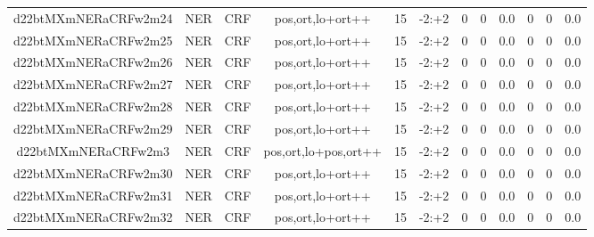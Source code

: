 \documentclass[a4paper]{article}
\begin{document}
\begin{landscape}
\begin{center}
\begin{tabular}{ |c|c|c|c|c|c|c|c|c|c|c|c|}
 
 	
 	\small{ d22btMXmNERaCRFw2m24 } & \small{ NER} & \small{  CRF }  & pos,ort,lo+ort++  &  15 &  \small{  -2:+2 }  &  0 & 0 & 0.0  &  0 & 0 & 0.0 \\
 	

 
 	
 	\small{ d22btMXmNERaCRFw2m25 } & \small{ NER} & \small{  CRF }  & pos,ort,lo+ort++  &  15 &  \small{  -2:+2 }  &  0 & 0 & 0.0  &  0 & 0 & 0.0 \\
 	

 
 	
 	\small{ d22btMXmNERaCRFw2m26 } & \small{ NER} & \small{  CRF }  & pos,ort,lo+ort++  &  15 &  \small{  -2:+2 }  &  0 & 0 & 0.0  &  0 & 0 & 0.0 \\
 	

 
 	
 	\small{ d22btMXmNERaCRFw2m27 } & \small{ NER} & \small{  CRF }  & pos,ort,lo+ort++  &  15 &  \small{  -2:+2 }  &  0 & 0 & 0.0  &  0 & 0 & 0.0 \\
 	

 
 	
 	\small{ d22btMXmNERaCRFw2m28 } & \small{ NER} & \small{  CRF }  & pos,ort,lo+ort++  &  15 &  \small{  -2:+2 }  &  0 & 0 & 0.0  &  0 & 0 & 0.0 \\
 	

 
 	
 	\small{ d22btMXmNERaCRFw2m29 } & \small{ NER} & \small{  CRF }  & pos,ort,lo+ort++  &  15 &  \small{  -2:+2 }  &  0 & 0 & 0.0  &  0 & 0 & 0.0 \\
 	

 
 	
 	\small{ d22btMXmNERaCRFw2m3 } & \small{ NER} & \small{  CRF }  & pos,ort,lo+pos,ort++  &  15 &  \small{  -2:+2 }  &  0 & 0 & 0.0  &  0 & 0 & 0.0 \\
 	

 
 	
 	\small{ d22btMXmNERaCRFw2m30 } & \small{ NER} & \small{  CRF }  & pos,ort,lo+ort++  &  15 &  \small{  -2:+2 }  &  0 & 0 & 0.0  &  0 & 0 & 0.0 \\
 	

 
 	
 	\small{ d22btMXmNERaCRFw2m31 } & \small{ NER} & \small{  CRF }  & pos,ort,lo+ort++  &  15 &  \small{  -2:+2 }  &  0 & 0 & 0.0  &  0 & 0 & 0.0 \\
 	

 
 	
 	\small{ d22btMXmNERaCRFw2m32 } & \small{ NER} & \small{  CRF }  & pos,ort,lo+ort++  &  15 &  \small{  -2:+2 }  &  0 & 0 & 0.0  &  0 & 0 & 0.0 \\
 	


\end{tabular}
\end{center}
\end{landscape}
\end{document}
